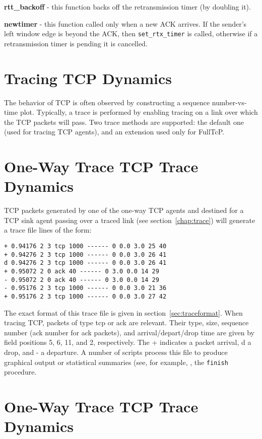 {\bf rtt\_backoff} - this function backs off the retransmission timer
(by doubling it).

{\bf newtimer} - this function called only when a new ACK arrives.
If the sender's left window edge is beyond the ACK, then
{\tt set\_rtx\_timer} is called, otherwise if a retransmission timer
is pending it is cancelled.

\section{Tracing TCP Dynamics}
\label{sec:traceTcpdyn}

The behavior of TCP is often observed by constructing a
sequence number-vs-time plot.
Typically, a trace is performed by enabling tracing on a link
over which the TCP packets will pass.
Two trace methods are supported: the default one (used for tracing
TCP agents), and an extension used only for FullTcP.

\section{One-Way Trace TCP Trace Dynamics}
\label{sec:trace1WayTcpdyn}

TCP packets generated by one of the one-way TCP agents and destined for
a TCP sink agent
passing over a traced link (see section~\ref{chap:trace})
will generate a trace file lines of the form:
\begin{verbatim}
+ 0.94176 2 3 tcp 1000 ------ 0 0.0 3.0 25 40
+ 0.94276 2 3 tcp 1000 ------ 0 0.0 3.0 26 41
d 0.94276 2 3 tcp 1000 ------ 0 0.0 3.0 26 41
+ 0.95072 2 0 ack 40 ------ 0 3.0 0.0 14 29
- 0.95072 2 0 ack 40 ------ 0 3.0 0.0 14 29
- 0.95176 2 3 tcp 1000 ------ 0 0.0 3.0 21 36
+ 0.95176 2 3 tcp 1000 ------ 0 0.0 3.0 27 42
\end{verbatim}
The exact format of this trace file is given in section~\ref{sec:traceformat}.
When tracing TCP, packets of type {\sf tcp} or {\sf ack} are relevant.
Their type, size, sequence number (ack number for ack packets),
and arrival/depart/drop time are given by field positions
5, 6, 11, and 2, respectively.
The {\sf +} indicates a packet arrival, {\sf d} a drop, and {\sf -} a
departure.
A number of scripts process this file to produce graphical output or
statistical summaries (see,  for example, , the
{\tt finish} procedure.

\section{One-Way Trace TCP Trace Dynamics}
\label{sec:tcpdyn}

